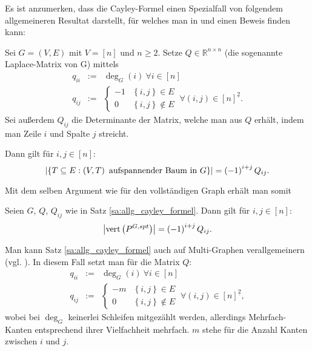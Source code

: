 \documentclass[10p,a4paper,BCOR = 12mm, DIV=15]{scrbook}
\begin{document}
Es ist anzumerken, dass die Cayley-Formel einen Spezialfall von folgendem allgemeineren Resultat darstellt, für welches man in \citep{matousek2007diskrete} und \cite{lovasz_combinatorics} einen Beweis finden kann:
\begin{Sa}
\label{sa:allg_cayley_formel}
Sei $G=\left(V, E\right)$ mit $V = \left[n\right]$ und $n \geq 2$. Setze $Q\in \mathbb{R}^{n \times n}$ (die sogenannte Laplace-Matrix von G) mittels
\begin{eqnarray*}
q_{i i} & := & \deg_G\left(i\right)\ \forall i \in \left[n\right] \\
q_{i j} & := & \begin{cases}
-1 & \left\{i, j\right\} \in E \\
0 & \left\{i, j\right\} \notin E
\end{cases}\ \forall \left(i, j\right) \in \left[n\right]^{\underline{2}}.
\end{eqnarray*}
Sei außerdem $Q_{i j}$ die Determinante der Matrix, welche man aus $Q$ erhält, indem man Zeile $i$ und Spalte $j$ streicht.

Dann gilt für $i, j \in \left[n\right]$:
\begin{displaymath}
\left|\left\{T \subseteq E: \left(V, T\right)\textnormal{ aufspannender Baum in }G\right\}\right| = \left(-1\right)^{i+j} Q_{i j}.
\end{displaymath}
\end{Sa}

Mit dem selben Argument wie für den vollständigen Graph erhält man somit
\begin{Kor}
Seien $G$, $Q$, $Q_{i j}$ wie in Satz \ref{sa:allg_cayley_formel}. Dann gilt für $i, j \in \left[n\right]$:
\begin{displaymath}
\left|\operatorname{vert} \left(P^{G, spt}\right)\right| = \left(-1\right)^{i+j} Q_{i j}.
\end{displaymath}
\end{Kor}

\begin{Bem}
Man kann Satz \ref{sa:allg_cayley_formel} auch auf Multi-Graphen verallgemeinern (vgl. \citep{matousek2007diskrete}). In diesem Fall setzt man für die Matrix $Q$:
\begin{eqnarray*}
q_{i i} & := & \deg_G\left(i\right)\ \forall i \in \left[n\right] \\
q_{i j} & := & \begin{cases}
-m & \left\{i, j\right\} \in E \\
0 & \left\{i, j\right\} \notin E
\end{cases}\ \forall \left(i, j\right) \in \left[n\right]^{\underline{2}},
\end{eqnarray*}
wobei bei $\deg_G$ keinerlei Schleifen mitgezählt werden, allerdings Mehrfach-Kanten entsprechend ihrer Vielfachheit mehrfach. $m$ stehe für die Anzahl Kanten zwischen $i$ und $j$.
\end{Bem}
\end{document}
